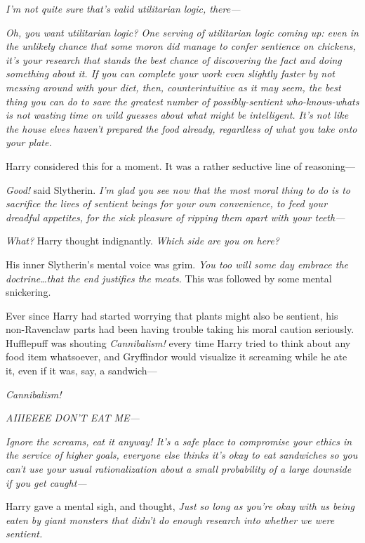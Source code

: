 \emph{I’m not quite sure that’s valid utilitarian logic, there—}

\emph{Oh, you want utilitarian logic? One serving of utilitarian logic coming
up: even in the unlikely chance that some moron \emph{did} manage to confer
sentience on chickens, it’s \emph{your} research that stands the best chance of
discovering the fact and doing something about it. If you can complete your
work even slightly faster by \emph{not} messing around with your diet, then,
counterintuitive as it may seem, the \emph{best} thing you can do to save the
greatest number of possibly-sentient who-knows-whats is \emph{not} wasting time
on wild guesses about what might be intelligent. It’s not like the house elves
haven’t prepared the food already, regardless of what you take onto your plate.}

Harry considered this for a moment. It was a rather seductive line of
reasoning—

\emph{Good!} said Slytherin. \emph{I’m glad you see now that the most moral
thing to do is to sacrifice the lives of sentient beings for your own
convenience, to feed your dreadful appetites, for the sick pleasure of ripping
them apart with your teeth—}

\emph{What?} Harry thought indignantly. \emph{Which side are you \emph{on} here?}

His inner Slytherin’s mental voice was grim. \emph{You too will some day embrace
the doctrine…that the end justifies the meats.} This was followed by
some mental snickering.

Ever since Harry had started worrying that plants might also be sentient, his
non-Ravenclaw parts had been having trouble taking his moral caution
seriously. Hufflepuff was shouting \emph{Cannibalism!} every time Harry tried
to think about any food item whatsoever, and Gryffindor would visualize it
screaming while he ate it, even if it was, say, a sandwich—

\emph{Cannibalism!}

\emph{AIIIEEEE DON’T EAT ME—}

\emph{Ignore the screams, eat it anyway! It’s a safe place to compromise your
ethics in the service of higher goals, everyone \emph{else} thinks it’s okay to
eat sandwiches so you can’t use your usual rationalization about a small
probability of a large downside if you get caught—}

Harry gave a mental sigh, and thought, \emph{Just so long as you’re okay with
\emph{us} being eaten by giant monsters that didn’t do enough research into
whether \emph{we} were sentient.}

